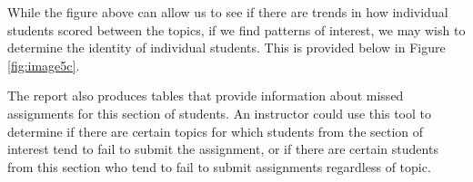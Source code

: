 \documentclass{article}\usepackage[]{graphicx}\usepackage[]{color}
\numberwithin{equation}{section} %
\begin{document}
While the figure above can allow us to see if there are trends in how individual students scored between the topics, if we find patterns of interest, we may wish to determine the identity of individual students. This is provided below in Figure \ref{fig:image5c}.

\begin{center}
\captionsetup{width=0.65\textwidth}
\label{fig:image5c}
\end{center}

The report also produces tables that provide information about missed assignments for this section of students. An instructor could use this tool to determine if there are certain topics for which students from the section of interest tend to fail to submit the assignment, or if there are certain students from this section who tend to fail to submit assignments regardless of topic.
\end{document}
